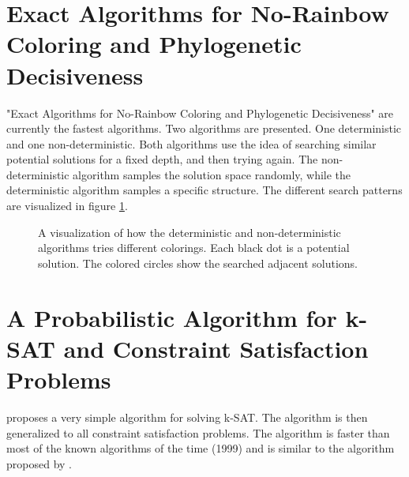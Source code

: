 \documentclass[msc,lith,english]{liuthesis}
\begin{document}
\section{Exact Algorithms for No-Rainbow Coloring and Phylogenetic Decisiveness}
"Exact Algorithms for No-Rainbow Coloring and Phylogenetic Decisiveness" are currently the fastest algorithms.
Two algorithms are presented. One deterministic and one non-deterministic. Both
algorithms use the idea of searching similar potential solutions for a fixed
depth, and then trying again. The non-deterministic algorithm samples the
solution space randomly, while the deterministic algorithm samples a specific
structure. The different search patterns are visualized in figure \ref{figNoRainbowSearchPattern}. \cite{sourceNoRainbow}

\begin{center}
\begin{figure}[h]
\centering
{}
  \caption{A visualization of how the deterministic and non-deterministic algorithms tries different colorings. Each black dot is a potential solution. The colored circles show the searched adjacent solutions.}
  \label{figNoRainbowSearchPattern}
\end{figure}
\end{center}

\section{A Probabilistic Algorithm for k-SAT and Constraint Satisfaction Problems}
\citeauthor{sourceProbAlgo} proposes a very simple algorithm for solving k-SAT.
The algorithm is then generalized to all constraint satisfaction problems. The
algorithm is faster than most of the known algorithms of the time (1999) and is
similar to the algorithm proposed by \citeauthor{sourceNoRainbow} \cite{sourceNoRainbow}.
\end{document}
